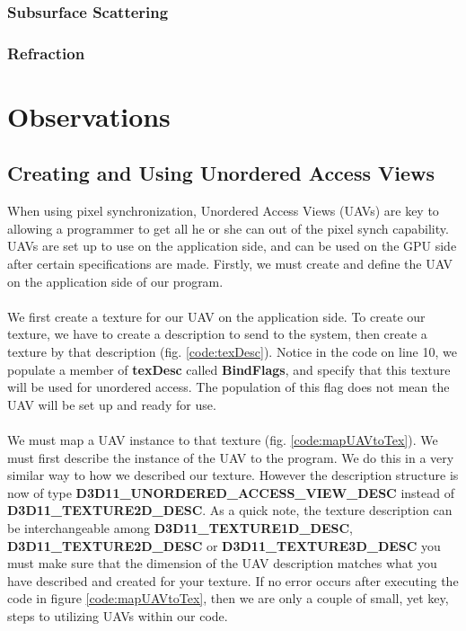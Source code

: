 \documentclass[a4paper, 12pt]{article}
\begin{document}
\subsubsection{Subsurface Scattering}

\lipsum[24-38]

\subsubsection{Refraction}

\lipsum[39-53]

\section{Observations}

\subsection{Creating and Using Unordered Access Views}
\label{section:UAVs}

When using pixel synchronization, Unordered Access Views (UAVs) are key to
allowing a programmer to get all he or she can out of the pixel synch
capability. UAVs are set up to use on the application side, and can be used on
the GPU side after certain specifications are made. Firstly, we must create
and define the UAV on the application side of our program. \\ \\ We first
create a texture for our UAV on the application side. To create our texture,
we have to create a description to send to the system, then create a texture
by that description (fig. \ref{code:texDesc}). Notice in the code on line 10,
we populate a member of \textbf{texDesc} called \textbf{BindFlags}, and
specify that this texture will be used for unordered access. The population of
this flag does not mean the UAV will be set up and ready for use. \\ \\ We
must map a UAV instance to that texture (fig. \ref{code:mapUAVtoTex}). We must
first describe the instance of the UAV to the program. We do this in a very
similar way to how we described our texture. However the description structure
is now of type \textbf{D3D11\_UNORDERED\_ACCESS\_VIEW\_DESC} instead of
\textbf{D3D11\_TEXTURE2D\_DESC}. As a quick note, the texture description can
be interchangeable among \textbf{D3D11\_TEXTURE1D\_DESC},
\textbf{D3D11\_TEXTURE2D\_DESC} or \textbf{D3D11\_TEXTURE3D\_DESC}\; you must
make sure that the dimension of the UAV description matches what you have
described and created for your texture. If no error occurs after executing the
code in figure \ref{code:mapUAVtoTex}, then we are only a couple of small, yet
key, steps to utilizing UAVs within our code.
\end{document}
